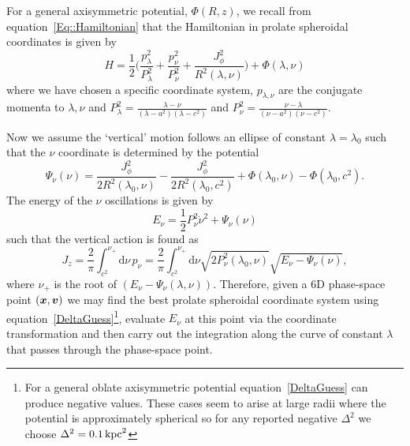 \documentclass[useAMS,usenatbib,fleqn,a4paper]{mn2e}
\def\kpc{\,{\rm kpc}}
\def\half{{\textstyle{\frac12}}}
\newcommand{\bs}[1]{\bmath{#1}}
\begin{document}
For a general axisymmetric potential, $\Phi(R,z)$, we recall from equation~\eqref{Eq::Hamiltonian} that the Hamiltonian in prolate spheroidal coordinates is given by
\begin{equation}
H = \half\Big(\frac{p_\lambda^2}{P_\lambda^2}+\frac{p_\nu^2}{P_\nu^2}+\frac{J_\phi^2}{R^2(\lambda,\nu)}\Big)+\Phi(\lambda,\nu)
\end{equation}
where we have chosen a specific coordinate system, $p_{\lambda,\nu}$ are the conjugate momenta to $\lambda,\nu$ and $P_\lambda^2 = \frac{\lambda-\nu}{(\lambda-a^2)(\lambda-c^2)}$ and $P_\nu^2 = \frac{\nu-\lambda}{(\nu-a^2)(\nu-c^2)}$.

Now we assume the `vertical' motion follows an ellipse of constant $\lambda=\lambda_0$ such that the $\nu$ coordinate is determined by the potential
\begin{equation}
\Psi_\nu(\nu) = \frac{J_\phi^2}{2R^2(\lambda_0,\nu)}-\frac{J_\phi^2}{2R^2(\lambda_0,c^2)}+\Phi(\lambda_0,\nu)-\Phi(\lambda_0,c^2).
\end{equation}
The energy of the $\nu$ oscillations is given by
\begin{equation}
E_\nu = \half P_\nu^2\dot{\nu}^2 + \Psi_\nu(\nu)
\end{equation}
such that the vertical action is found as
\begin{equation}
J_z = \frac{2}{\pi}\int_{c^2}^{\nu_+}\mathrm{d}\nu\,p_\nu = \frac{2}{\pi}\int_{c^2}^{\nu_+}\mathrm{d}\nu\sqrt{2P_\nu^2(\lambda_0,\nu)}\sqrt{E_\nu-\Psi_\nu(\nu)},
\end{equation}
where $\nu_+$ is the root of $(E_\nu-\Psi_\nu(\lambda,\nu))$. Therefore, given a 6D phase-space point $(\bs{x},\bs{v})$ we may find the best prolate spheroidal coordinate system using equation~\eqref{DeltaGuess}\footnote{For a general oblate axisymmetric potential equation~\eqref{DeltaGuess} can produce negative values. These cases seem to arise at large radii where the potential is approximately spherical so for any reported negative $\Delta^2$ we choose $\Delta^2 = 0.1\kpc^2$}, evaluate $E_\nu$ at this point via the coordinate transformation and then carry out the integration along the curve of constant $\lambda$ that passes through the phase-space point.
\end{document}
